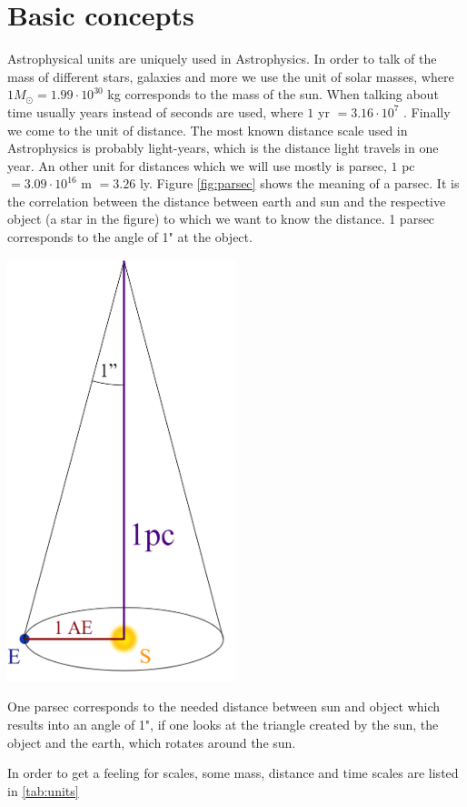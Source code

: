 \section{Basic concepts}
Astrophysical units are uniquely used in Astrophysics. In order to talk of the mass of different stars, galaxies and more we use the unit of solar masses, where $1 M_{\odot} = 1.99 \cdot 10^{30}$ kg corresponds to the mass of the sun. When talking about time usually years instead of seconds are used, where $1$ yr $ = 3.16 \cdot 10^7$ . Finally we come to the unit of distance. The most known distance scale used in Astrophysics is probably light-years, which is the distance light travels in one year. An other unit for distances which we will use mostly is parsec, $1$ pc $ = 3.09 \cdot 10^{16}$ m $ = 3.26$ ly. Figure \ref{fig:parsec} shows the meaning of a parsec. It is the correlation between the distance between earth and sun and the respective object (a star in the figure) to which we want to know the distance. 1 parsec corresponds to the angle of 1" at the object. 
\begin{marginfigure}
	\centering
		\includegraphics[width=0.5\textwidth]{img/ch-01/parsec.png}
		\caption{One parsec corresponds to the needed distance between sun and object which results into an angle of 1", if one looks at the triangle created by the sun, the object and the earth, which rotates around the sun.}
		\label{fig:parsec}
\end{marginfigure}
In order to get a feeling for scales, some mass, distance and time scales are listed in \cref{tab:units}

